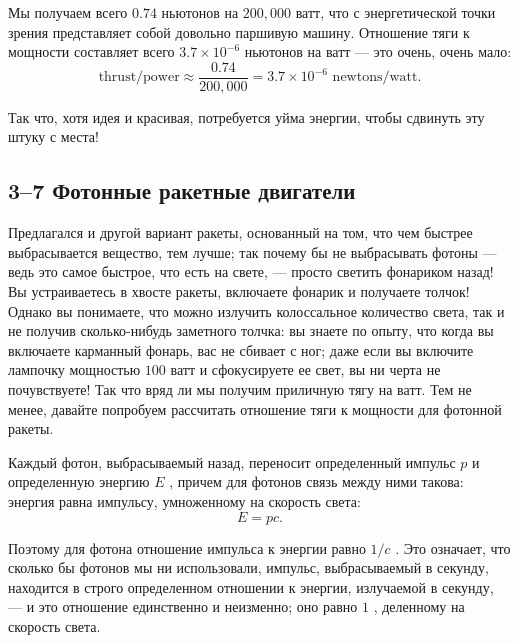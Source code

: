 \documentclass[11pt,oneside]{article}
\begin{document}
Мы получаем всего \(0.74\) ньютонов на \(200,\!000\) ватт, что с энергетической точки зрения представляет собой довольно паршивую машину. Отношение тяги к мощности составляет всего \(3.7\times10^{-6}\) ньютонов на ватт --- это очень, очень мало: 
\begin{equation*} \tag{3.27}
\label{Eq:TIPS:3:27} \text{thrust/power} \approx \frac{0.74}{200,\!000} = 3.7\times10^{-6}\text{ newtons/watt}. \end{equation*}
\par

Так что, хотя идея и красивая, потребуется уйма энергии, чтобы сдвинуть эту штуку с места!\par

\subsection*{3--7 Фотонные ракетные двигатели}

Предлагался и другой вариант ракеты, основанный на том, что чем быстрее выбрасывается вещество, тем лучше; так почему бы не выбрасывать фотоны --- ведь это самое быстрое, что есть на свете, --- просто светить фонариком назад! Вы устраиваетесь в хвосте ракеты, включаете фонарик и получаете толчок! Однако вы понимаете, что можно излучить колоссальное количество света, так и не получив сколько-нибудь заметного толчка: вы знаете по опыту, что когда вы включаете карманный фонарь, вас не сбивает с ног; даже если вы включите лампочку мощностью \(100\) ватт и сфокусируете ее свет, вы ни черта не почувствуете! Так что вряд ли мы получим приличную тягу на ватт. Тем не менее, давайте попробуем рассчитать отношение тяги к мощности для фотонной ракеты.\par

Каждый фотон, выбрасываемый назад, переносит определенный импульс \(p\) и определенную энергию \(E\) , причем для фотонов связь между ними такова: энергия равна импульсу, умноженному на скорость света: 
\begin{equation*} \tag{3.28}
\label{Eq:TIPS:3:28} E = pc. \end{equation*}
\par

Поэтому для фотона отношение импульса к энергии равно \(1/c\) . Это означает, что сколько бы фотонов мы ни использовали, импульс, выбрасываемый в секунду, находится в строго определенном отношении к энергии, излучаемой в секунду, --- и это отношение единственно и неизменно; оно равно \(1\) , деленному на скорость света.\par
\end{document}
